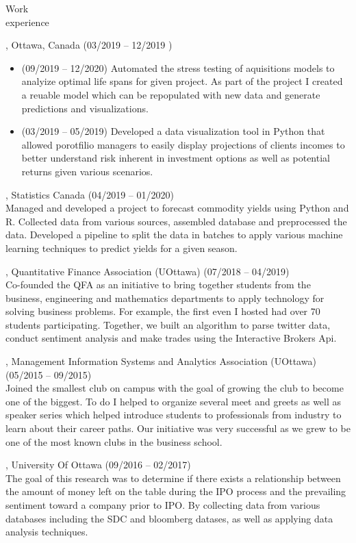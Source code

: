 \documentclass{resume}
\begin{document}
\begin{category}{Work \\experience}

, Ottawa, Canada (03/2019 -- 12/2019 )
\begin{itemize}
  \item (09/2019 -- 12/2020) Automated the stress testing of aquisitions
   models to analyize optimal life spans for given project. As part of the project 
    I created a reuable model which can be repopulated with new data and generate predictions and visualizations.
  \item (03/2019 -- 05/2019) Developed a data visualization tool in Python that allowed
    porotfilio managers to easily display projections of clients incomes to better understand risk
    inherent in investment options as well as potential returns given various scenarios.
\end{itemize}

, Statistics Canada (04/2019 -- 01/2020)\\
Managed and developed a project to forecast commodity yields using Python and R. Collected data
from various sources, assembled database and preprocessed the data. Developed a pipeline to 
split the data in batches to apply various machine learning techniques to predict yields for a given
season.

, Quantitative Finance Association (UOttawa) (07/2018 -- 04/2019)\\
Co-founded the QFA as an initiative to bring together students from the business, engineering
 and mathematics departments to apply technology for solving business problems. For example,
 the first even I hosted had over 70 students participating. Together, we built an algorithm to 
 parse twitter data, conduct sentiment analysis and make trades using the Interactive Brokers Api.

, Management Information Systems and Analytics Association (UOttawa) (05/2015 -- 09/2015)\\
Joined the smallest club on campus with the goal of growing the club to become one of the biggest.
To do I helped to organize several meet and greets as well as speaker series which helped introduce
students to professionals from industry to learn about their career paths. Our initiative was 
very successful as we grew to be one of the most known clubs in the business school.

, University Of Ottawa (09/2016 -- 02/2017)\\
The goal of this research was to determine if there exists a relationship between
the amount of money left on the table during the IPO process and the prevailing sentiment
toward a company prior to IPO. By collecting data from various databases including the SDC and 
bloomberg datases, as well as applying data analysis techniques. 

\end{category}
\end{document}
